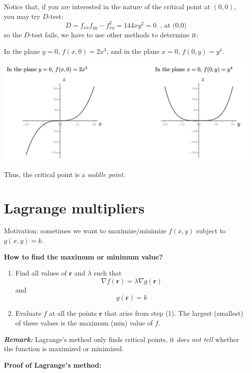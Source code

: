 \begin{spacing}{1.3}
    \vspace{0.5in}
    Notice that, if you are interested in the nature of the critical point at $(0,0)$, you may try $D$-test:
    $$D=f_{xx}f_{yy}-f_{xy}^2=144xy^2=0\ \text{\ ,\ at (0,0)}$$
    so the $D$-test fails, we have to use other methods to determine it:

    In the plane $y=0$, $f(x,0)=2x^3$, and in the plane $x=0$, $f(0,y)=y^4$.
    \begin{center}
        \includegraphics[scale=0.46]{images/Ch13-ex1.4.png}
    \end{center}
    Thus, the critical point is a {\it saddle point.}


    \newpage
    \section{Lagrange multipliers}

    {\blue Motivation: sometimes we want to maximize/minimize $f(x,y)$ subject to $g(x,y)=k$.}

    {\bf How to find the maximum or minimum value?}
    \begin{enumerate}
        \item Find all values of $\mathbf{r}$ and $\lambda$ such that
        $$\nabla f(\mathbf{r})=\lambda \nabla g(\mathbf{r})$$
        and $$g(\mathbf{r})=k$$
        \item Evaluate $f$ at all the points $\mathbf{r}$ that arise from step (1). 
        The largest (smallest) of these values is the maximum (min) value of $f$.
    \end{enumerate}

    {\it \textbf{Remark:}} Lagrange's method only finds critical points, 
    it {\it does not tell} whether the function is maximized or minimized.

    \vspace{0.5in}
    {\bf Proof of Lagrange's method:}


\end{spacing}
